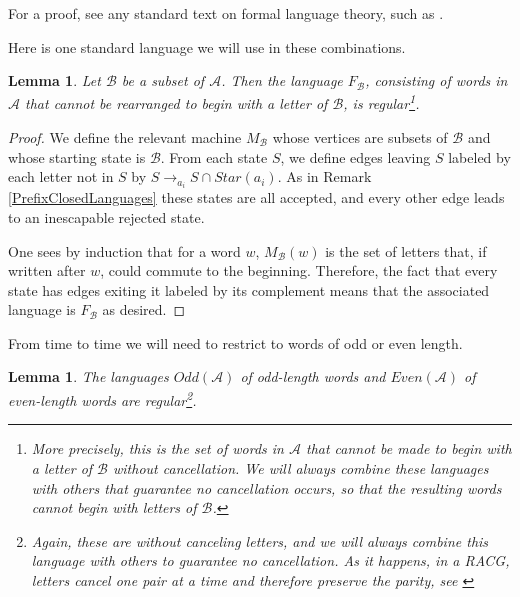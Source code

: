 \documentclass{amsart}
\newtheorem{lemma}[theorem]{Lemma}
\theoremstyle{definition}
\theoremstyle{remark}
\begin{document}
	For a proof, see any standard text on formal language theory, such as \cite{WordProcessing}.
	
	Here is one standard language we will use in these combinations.
	
	\begin{lemma}
		
		Let $\mathscr{B}$ be a subset of $\mathscr{A}$. Then the language $F_\mathscr{B}$, consisting of words in $\mathscr{A}$ that cannot be rearranged to begin with a letter of $\mathscr{B}$, is regular\footnote{More precisely, this is the set of words in $\mathscr{A}$ that cannot be made to begin with a letter of $\mathscr{B}$ without cancellation. We will always combine these languages with others that guarantee no cancellation occurs, so that the resulting words cannot begin with letters of $\mathscr{B}$.}.
		
	\end{lemma}
	
	\begin{proof}
		
		We define the relevant machine $M_\mathscr{B}$ whose vertices are subsets of $\mathscr{B}$ and whose starting state is $\mathscr{B}$. From each state $S$, we define edges leaving $S$ labeled by each letter not in $S$ by $S\to_{a_i} S\cap Star(a_i)$. As in Remark \ref{PrefixClosedLanguages} these states are all accepted, and every other edge leads to an inescapable rejected state.
		
		One sees by induction that for a word $w$, $M_{\mathscr{B}}(w)$ is the set of letters that, if written after $w$, could commute to the beginning. Therefore, the fact that every state has edges exiting it labeled by its complement means that the associated language is $F_{\mathscr{B}}$ as desired.
	\end{proof}
	
	From time to time we will need to restrict to words of odd or even length.
	
	\begin{lemma}
		
		The languages $Odd(\mathscr{A})$ of odd-length words and $Even(\mathscr{A})$ of even-length words are regular\footnote{Again, these are without canceling letters, and we will always combine this language with others to guarantee no cancellation. As it happens, in a RACG, letters cancel one pair at a time and therefore preserve the parity, see \cite{Davis}}.
		
	\end{lemma}
	
\end{document}
